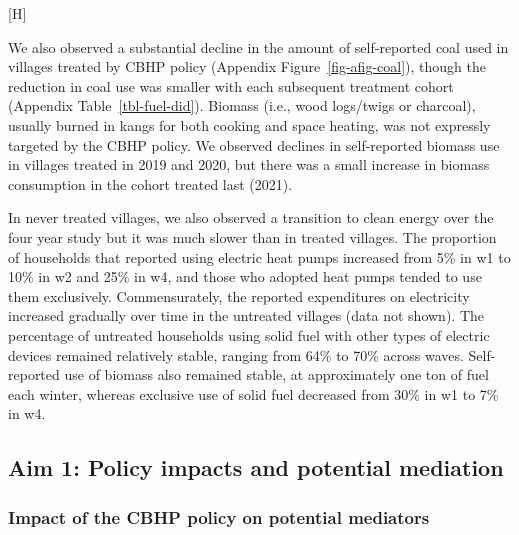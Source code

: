 \documentclass[
  letterpaper,
  DIV=11,
  numbers=noendperiod]{scrartcl}
\makeatletter
\renewenvironment{figure}%
   {\renewcommand\familydefault\sfdefault
    \@float{figure}}
   {\end@float}
\makeatother
\begin{document}
\begin{figure}[H]


\caption{\label{fig-sankey}Transitions to different energy sources
across study waves}

\end{figure}%

We also observed a substantial decline in the amount of self-reported
coal used in villages treated by CBHP policy (Appendix
Figure~\ref{fig-afig-coal}), though the reduction in coal use was
smaller with each subsequent treatment cohort (Appendix
Table~\ref{tbl-fuel-did}). Biomass (i.e., wood logs/twigs or charcoal),
usually burned in kangs for both cooking and space heating, was not
expressly targeted by the CBHP policy. We observed declines in
self-reported biomass use in villages treated in 2019 and 2020, but
there was a small increase in biomass consumption in the cohort treated
last (2021).

In never treated villages, we also observed a transition to clean energy
over the four year study but it was much slower than in treated
villages. The proportion of households that reported using electric heat
pumps increased from 5\% in w1 to 10\% in w2 and 25\% in w4, and those
who adopted heat pumps tended to use them exclusively. Commensurately,
the reported expenditures on electricity increased gradually over time
in the untreated villages (data not shown). The percentage of untreated
households using solid fuel with other types of electric devices
remained relatively stable, ranging from 64\% to 70\% across waves.
Self-reported use of biomass also remained stable, at approximately one
ton of fuel each winter, whereas exclusive use of solid fuel decreased
from 30\% in w1 to 7\% in w4.

\subsection{Aim 1: Policy impacts and potential
mediation}\label{aim-1-policy-impacts-and-potential-mediation}

\subsubsection{Impact of the CBHP policy on potential
mediators}\label{impact-of-the-cbhp-policy-on-potential-mediators}
\end{document}
